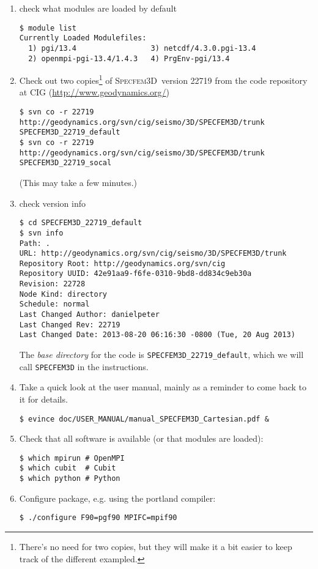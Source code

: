 \documentclass[10pt,fleqn,letterpaper]{article}
\newcommand{\specfem}{\textsc{Specfem3D}}
\begin{document}
\begin{enumerate}
\item check what modules are loaded by default
\begin{lstlisting}
$ module list
Currently Loaded Modulefiles:
  1) pgi/13.4                 3) netcdf/4.3.0.pgi-13.4
  2) openmpi-pgi-13.4/1.4.3   4) PrgEnv-pgi/13.4
\end{lstlisting}

\item Check out two copies\footnote{There's no need for two copies, but they will make it a bit easier to keep track of the different exampled.} of \specfem\ version 22719 from the code repository at CIG (\url{http://www.geodynamics.org/})
%
\begin{lstlisting}
$ svn co -r 22719 http://geodynamics.org/svn/cig/seismo/3D/SPECFEM3D/trunk SPECFEM3D_22719_default
$ svn co -r 22719 http://geodynamics.org/svn/cig/seismo/3D/SPECFEM3D/trunk SPECFEM3D_22719_socal
\end{lstlisting}
%
(This may take a few minutes.)

\item check version info
%
\begin{lstlisting}
$ cd SPECFEM3D_22719_default
$ svn info
Path: .
URL: http://geodynamics.org/svn/cig/seismo/3D/SPECFEM3D/trunk
Repository Root: http://geodynamics.org/svn/cig
Repository UUID: 42e91aa9-f6fe-0310-9bd8-dd834c9eb30a
Revision: 22728
Node Kind: directory
Schedule: normal
Last Changed Author: danielpeter
Last Changed Rev: 22719
Last Changed Date: 2013-08-20 06:16:30 -0800 (Tue, 20 Aug 2013)
\end{lstlisting}

The {\em base directory} for the code is \verb+SPECFEM3D_22719_default+, which we will call \verb+SPECFEM3D+ in the instructions.

\item Take a quick look at the user manual, mainly as a reminder to come back to it for details. 
%
\begin{lstlisting}
$ evince doc/USER_MANUAL/manual_SPECFEM3D_Cartesian.pdf &
\end{lstlisting}

\item Check that all software is available (or that modules are loaded):
\begin{lstlisting}
$ which mpirun # OpenMPI
$ which cubit  # Cubit
$ which python # Python
\end{lstlisting}

\item Configure package, e.g. using the portland compiler:
\begin{lstlisting}
$ ./configure F90=pgf90 MPIFC=mpif90
\end{lstlisting}


\end{enumerate}
\end{document}
